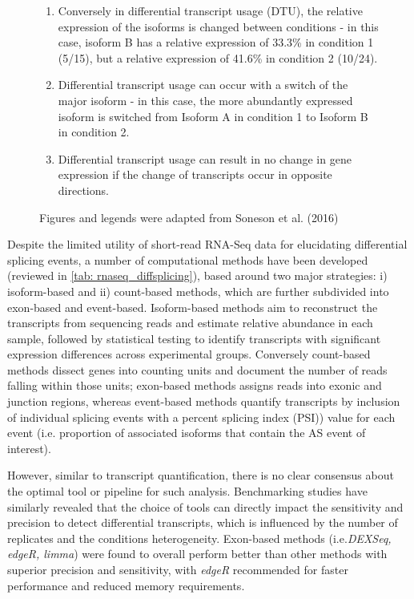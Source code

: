 \begin{figure}[htp]
{\begin{enumerate}[label=\textbf{\Alph*})]
		\item Conversely in differential transcript usage (DTU), the relative expression of the isoforms is changed between conditions - in this case, isoform B has a relative expression of 33.3\% in condition 1 (5/15), but a relative expression of 41.6\% in condition 2 (10/24).
		\item Differential transcript usage can occur with a switch of the major isoform - in this case, the more abundantly expressed isoform is switched from Isoform A in condition 1 to Isoform B in condition 2. 
		\item Differential transcript usage can result in no change in gene expression if the change of transcripts occur in opposite directions.
		\\
	\end{enumerate} 
	Figures and legends were adapted from Soneson et al. (2016)\cite{Soneson2016} 
   }
	\label{fig:dte_dtu_explanation}
\end{figure}

Despite the limited utility of short-read RNA-Seq data for elucidating differential splicing events, a number of computational methods have been developed (reviewed in \cref{tab: rnaseq_diffsplicing}), based around two major strategies: i) isoform-based and ii) count-based methods, which are further subdivided into exon-based and event-based. Isoform-based methods aim to reconstruct the transcripts from sequencing reads and estimate relative abundance in each sample, followed by statistical testing to identify transcripts with significant expression differences across experimental groups\cite{Mehmood2020}. Conversely count-based methods dissect genes into counting units and document the number of reads falling within those units\cite{Mehmood2020}; exon-based methods assigns reads into exonic and junction regions, whereas event-based methods quantify transcripts by inclusion of individual splicing events with a percent splicing index (PSI)) value for each event (i.e. proportion of associated isoforms that contain the AS event of interest). 

However, similar to transcript quantification, there is no clear consensus about the optimal tool or pipeline for such analysis. Benchmarking studies have similarly revealed that the choice of tools can directly impact the sensitivity and precision to detect differential transcripts, which is influenced by the number of replicates and the conditions heterogeneity\cite{Merino2019}. Exon-based methods (i.e.\textit{DEXSeq, edgeR, limma}) were found to overall perform better than other methods with superior precision and sensitivity, with \textit{edgeR} recommended for faster performance and reduced memory requirements\cite{Mehmood2020}. 


